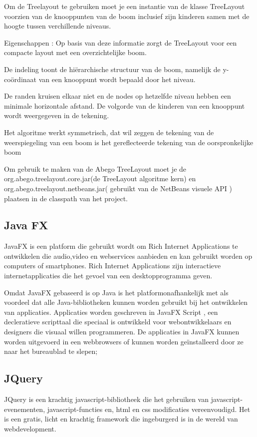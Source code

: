 \documentclass[pdftex,a4paper,12pt,twoside]{report}
\begin{document}
Om de Treelayout te gebruiken moet je een instantie van de klasse TreeLayout voorzien van de knooppunten van de boom inclusief zijn kinderen samen met de hoogte tussen verchillende niveaus.

Eigenschappen :
Op basis van deze informatie zorgt de TreeLayout voor een compacte layout met een overzichtelijke boom.

De indeling toont de hiërarchische structuur van de boom, namelijk de y-coördinaat van een knooppunt wordt bepaald door het niveau.

De randen kruisen elkaar niet en de nodes op hetzelfde niveau hebben een minimale horizontale afstand.
De volgorde van de kinderen van een knooppunt wordt weergegeven in de tekening.

Het algoritme werkt symmetrisch, dat wil zeggen de tekening van de weerspiegeling van een boom is het gereflecteerde tekening van de oorspronkelijke boom


Om gebruik te maken van de Abego TreeLayout moet je de org.abego.treelayout.core.jar(de TreeLayout algoritme kern) en org.abego.treelayout.netbeans.jar( gebruikt  van de NetBeans visuele API ) plaatsen in de classpath van het project.


\subsection{Java FX}
JavaFX is een platform die gebruikt wordt om Rich Internet Applications te ontwikkelen die audio,video en webservices aanbieden en kan gebruikt worden op computers of smartphones.
Rich Internet Applications zijn interactieve internetapplicaties die het gevoel van een desktopprogramma geven.

Omdat JavaFX gebaseerd is op Java is het platformonafhankelijk met als voordeel dat alle Java-bibliotheken kunnen worden gebruikt bij het ontwikkelen van applicaties.
Applicaties worden geschreven in JavaFX Script , een decleratieve scripttaal die speciaal is ontwikkeld voor webontwikkelaars en designers die visuaal willen programmeren. 
De applicaties in JavaFX kunnen worden uitgevoerd in een webbrowsers of kunnen worden geïnstalleerd  door ze naar het bureaublad  te slepen;

\subsection{JQuery}
JQuery is een krachtig javascript-bibliotheek die het gebruiken van javascript-evenementen, javascript-functies en, html en css modificaties vereenvoudigd. Het is een gratis, licht en krachtig framework die ingeburgerd is in de wereld van webdevelopment.
\end{document}
